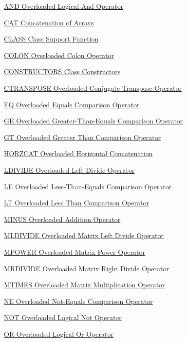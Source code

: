 
\begin{DoxyItemize}
\item \hyperlink{class_and}{A\-N\-D Overloaded Logical And Operator}  
\item \hyperlink{class_cat}{C\-A\-T Concatenation of Arrays}  
\item \hyperlink{class_class}{C\-L\-A\-S\-S Class Support Function}  
\item \hyperlink{class_colon}{C\-O\-L\-O\-N Overloaded Colon Operator}  
\item \hyperlink{class_constructors}{C\-O\-N\-S\-T\-R\-U\-C\-T\-O\-R\-S Class Constructors}  
\item \hyperlink{class_ctranspose}{C\-T\-R\-A\-N\-S\-P\-O\-S\-E Overloaded Conjugate Transpose Operator}  
\item \hyperlink{class_eq}{E\-Q Overloaded Equals Comparison Operator}  
\item \hyperlink{class_ge}{G\-E Overloaded Greater-\/\-Than-\/\-Equals Comparison Operator}  
\item \hyperlink{class_gt}{G\-T Overloaded Greater Than Comparison Operator}  
\item \hyperlink{class_horzcat}{H\-O\-R\-Z\-C\-A\-T Overloaded Horizontal Concatenation}  
\item \hyperlink{class_ldivide}{L\-D\-I\-V\-I\-D\-E Overloaded Left Divide Operator}  
\item \hyperlink{class_le}{L\-E Overloaded Less-\/\-Than-\/\-Equals Comparison Operator}  
\item \hyperlink{class_lt}{L\-T Overloaded Less Than Comparison Operator}  
\item \hyperlink{class_minus}{M\-I\-N\-U\-S Overloaded Addition Operator}  
\item \hyperlink{class_mldivide}{M\-L\-D\-I\-V\-I\-D\-E Overloaded Matrix Left Divide Operator}  
\item \hyperlink{class_mpower}{M\-P\-O\-W\-E\-R Overloaded Matrix Power Operator}  
\item \hyperlink{class_mrdivide}{M\-R\-D\-I\-V\-I\-D\-E Overloaded Matrix Right Divide Operator}  
\item \hyperlink{class_mtimes}{M\-T\-I\-M\-E\-S Overloaded Matrix Multiplication Operator}  
\item \hyperlink{class_ne}{N\-E Overloaded Not-\/\-Equals Comparison Operator}  
\item \hyperlink{class_not}{N\-O\-T Overloaded Logical Not Operator}  
\item \hyperlink{class_or}{O\-R Overloaded Logical Or Operator}  

\end{DoxyItemize}
